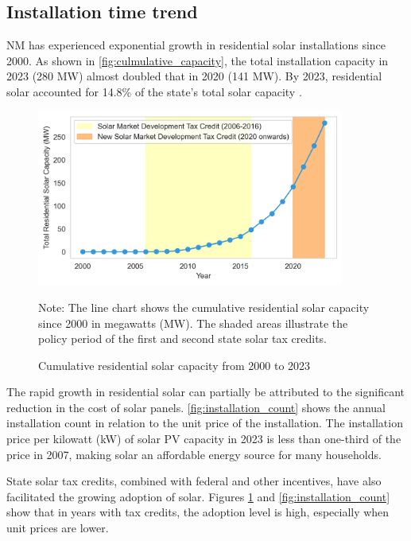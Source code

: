 \documentclass[11pt,twoside,letterpaper]{article}
\begin{document}
\subsection{Installation time trend}
 
NM has experienced exponential growth in residential solar installations since 2000. As shown in \autoref{fig:culmulative_capacity}, the total installation capacity in 2023 (280 MW) almost doubled that in 2020 (141 MW). By 2023, residential solar accounted for 14.8\% of the state’s total solar capacity \parencite{seia2023nm}.

\begin{figure}[!ht]
    \centering
\includegraphics[width=0.9\textwidth]{figures/cumulative_capacity.png}
    \caption{Cumulative residential solar capacity from 2000 to 2023}
    \label{fig:culmulative_capacity}
    \begin{flushleft}
        \footnotesize Note: The line chart shows the cumulative residential solar capacity since 2000 in megawatts (MW). The shaded areas illustrate the policy period of the first and second state solar tax credits.  
    \end{flushleft}
    
\end{figure}


The rapid growth in residential solar can partially be attributed to the significant reduction in the cost of solar panels. \autoref{fig:installation_count} shows the annual installation count in relation to the unit price of the installation. The installation price per kilowatt (kW) of solar PV capacity in 2023 is less than one-third of the price in 2007, making solar an affordable energy source for many households.

State solar tax credits, combined with federal and other incentives, have also facilitated the growing adoption of solar. Figures \ref{fig:culmulative_capacity} and \ref{fig:installation_count} show that in years with tax credits, the adoption level is high, especially when unit prices are lower.
\end{document}
